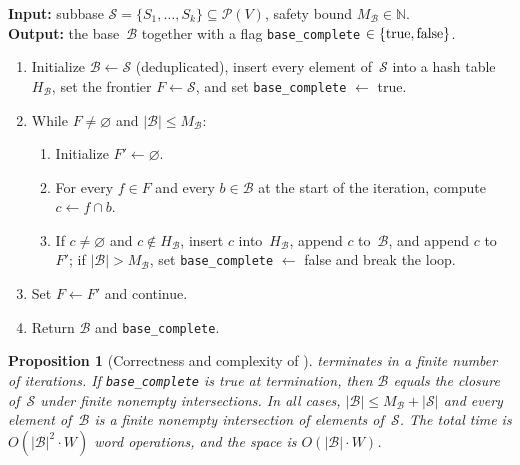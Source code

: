 \documentclass[11pt,a4paper]{article}
\theoremstyle{plain}
\newtheorem{proposition}[theorem]{Proposition}
\theoremstyle{definition}
\newcommand{\powerset}{\mathcal{P}}
\newcommand{\subbase}{\mathcal{S}}
\newcommand{\base}{\mathcal{B}}
\begin{document}
\begin{algorithm}
\caption{Intersection closure by wavefront propagation}%
\label{alg:intersection-closure}
\textbf{Input:} subbase $\subbase = \{S_1, \ldots, S_k\} \subseteq
\powerset(V)$, safety bound $M_{\base} \in \mathbb{N}$. \\
\textbf{Output:} the base~$\base$ together with a flag
\texttt{base\_complete} $\in \{\textup{true}, \textup{false}\}$.
\begin{enumerate}[leftmargin=2em, label=\textup{(\arabic*)}]
  \item Initialize $\base \leftarrow \subbase$ (deduplicated), insert every
        element of~$\subbase$ into a hash table $H_{\base}$, set the frontier
        $F \leftarrow \subbase$, and set \texttt{base\_complete}
        $\leftarrow$ \textup{true}.
  \item While $F \neq \varnothing$ and $|\base| \leq M_{\base}$:
  \begin{enumerate}[leftmargin=1.5em, label=\textup{(\alph*)}]
    \item Initialize $F' \leftarrow \varnothing$.
    \item For every $f \in F$ and every $b \in \base$ at the start of the
          iteration, compute $c \leftarrow f \cap b$.
    \item If $c \neq \varnothing$ and $c \notin H_{\base}$, insert $c$
          into~$H_{\base}$, append $c$ to~$\base$, and append $c$ to~$F'$;
          if $|\base| > M_{\base}$, set \texttt{base\_complete}
          $\leftarrow$ \textup{false} and break the loop.
  \end{enumerate}
  \item Set $F \leftarrow F'$ and continue.
  \item Return $\base$ and \texttt{base\_complete}.
\end{enumerate}
\end{algorithm}

\begin{proposition}[Correctness and complexity of
]%
\label{prop:intersection-closure-correct}
 terminates in a finite number of iterations.
If \texttt{base\_complete} is \textup{true} at termination, then $\base$
equals the closure of~$\subbase$ under finite nonempty intersections.  In all
cases, $|\base| \leq M_{\base} + |\subbase|$ and every element of~$\base$ is
a finite nonempty intersection of elements of~$\subbase$.  The total time is
$O(|\base|^{2} \cdot W)$ word operations, and the space is
$O(|\base| \cdot W)$.
\end{proposition}
\end{document}
